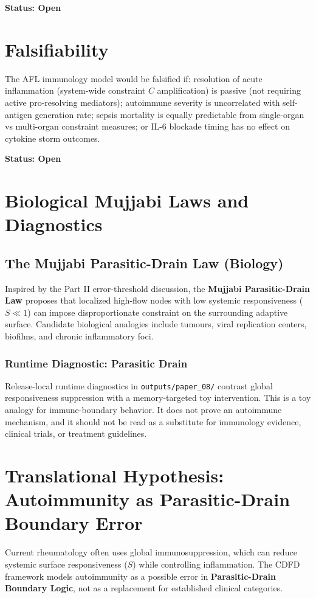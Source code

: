 \documentclass[12pt,a4paper]{article}
\begin{document}
\textbf{Status: Open}

\section{Falsifiability}

The AFL immunology model would be falsified if: resolution of acute inflammation (system-wide constraint $C$ amplification) is passive (not requiring active pro-resolving mediators); autoimmune severity is uncorrelated with self-antigen generation rate; sepsis mortality is equally predictable from single-organ vs multi-organ constraint measures; or IL-6 blockade timing has no effect on cytokine storm outcomes.

\textbf{Status: Open}


\section{Biological Mujjabi Laws and Diagnostics}

\subsection{The Mujjabi Parasitic-Drain Law \cite{MujjabiPartII2026} (Biology)}
Inspired by the Part II error-threshold discussion, the \textbf{Mujjabi Parasitic-Drain Law \cite{MujjabiPartII2026}} proposes that localized high-flow nodes with low systemic responsiveness ($S \ll 1$) can impose disproportionate constraint on the surrounding adaptive surface. Candidate biological analogies include tumours, viral replication centers, biofilms, and chronic inflammatory foci.

\subsubsection{Runtime Diagnostic: Parasitic Drain}
Release-local runtime diagnostics in \texttt{outputs/paper\_08/} contrast global responsiveness suppression with a memory-targeted toy intervention. This is a toy analogy for immune-boundary behavior. It does not prove an autoimmune mechanism, and it should not be read as a substitute for immunology evidence, clinical trials, or treatment guidelines.

\section{Translational Hypothesis: Autoimmunity as Parasitic-Drain Boundary Error}
Current rheumatology often uses global immunosuppression, which can reduce systemic surface responsiveness ($S$) while controlling inflammation. The CDFD framework models autoimmunity as a possible error in \textbf{Parasitic-Drain Boundary Logic}, not as a replacement for established clinical categories. 
\end{document}
